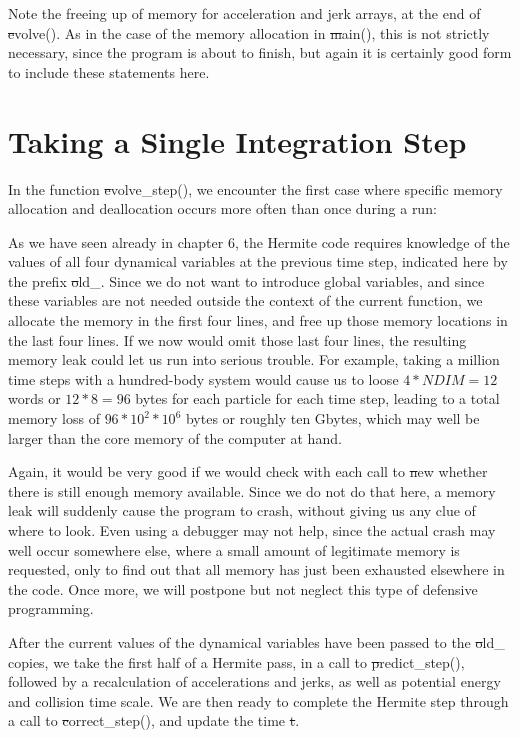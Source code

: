 Note the freeing up of memory for acceleration and jerk arrays, at the
end of {\st evolve()}.  As in the case of the memory allocation in
{\st main()}, this is not strictly necessary, since the program is
about to finish, but again it is certainly good form to include these
statements here.

\section{Taking a Single Integration Step}

In the function {\st evolve\_step()}, we encounter the first case where
specific memory allocation and deallocation occurs more often than once
during a run:


As we have seen already in chapter 6, the Hermite code requires
knowledge of the values of all four dynamical variables at the
previous time step, indicated here by the prefix {\st old\_}.  Since
we do not want to introduce global variables, and since these
variables are not needed outside the context of the current function,
we allocate the memory in the first four lines, and free up those
memory locations in the last four lines.  If we now would omit those
last four lines, the resulting memory leak could let us run into
serious trouble.  For example, taking a million time steps with a
hundred-body system would cause us to loose $4*NDIM=12$ words or
$12*8=96$ bytes for each particle for each time step, leading to a
total memory loss of $96*10^2*10^6$ bytes or roughly ten Gbytes, which
may well be larger than the core memory of the computer at hand.

Again, it would be very good if we would check with each call to {\st
new} whether there is still enough memory available.  Since we do not
do that here, a memory leak will suddenly cause the program to crash,
without giving us any clue of where to look.  Even using a debugger
may not help, since the actual crash may well occur somewhere else,
where a small amount of legitimate memory is requested, only to find
out that all memory has just been exhausted elsewhere in the code.
Once more, we will postpone but not neglect this type of defensive
programming.

After the current values of the dynamical variables have been passed
to the {\st old\_} copies, we take the first half of a Hermite pass,
in a call to {\st predict\_step()}, followed by a recalculation of
accelerations and jerks, as well as potential energy and collision
time scale.  We are then ready to complete the Hermite step through a
call to {\st correct\_step()}, and update the time {\st t}.

